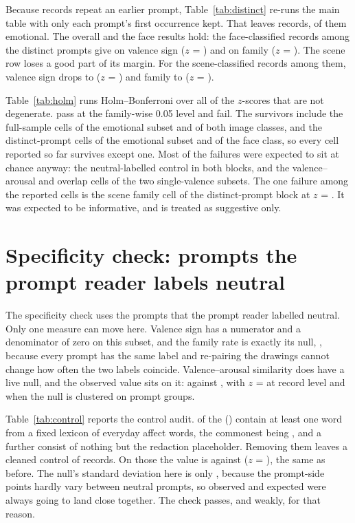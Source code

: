 Because \nRepeats{} records repeat an earlier prompt, Table~\ref{tab:distinct} re-runs the main table with only each prompt's first occurrence kept. That leaves \nDistinct{} records, \nDistinctEmo{} of them emotional. The overall and the face results hold: the \DistFaceN{} face-classified records among the distinct prompts give \DistFaceSignObs{} on valence sign ($z$ = \DistFaceSignZ{}) and \DistFaceFamObs{} on family ($z$ = \DistFaceFamZ{}). The scene row loses a good part of its margin. For the \DistSceneN{} scene-classified records among them, valence sign drops to \DistSceneSignObs{} ($z$ = \DistSceneSignZ{}) and family to \DistSceneFamObs{} ($z$ = \DistSceneFamZ{}).

Table~\ref{tab:holm} runs Holm--Bonferroni over all \HolmM{} of the $z$-scores that are not degenerate. \HolmSurvive{} pass at the family-wise 0.05 level and \HolmFail{} fail. The survivors include the full-sample cells of the emotional subset and of both image classes, and the distinct-prompt cells of the emotional subset and of the face class, so every cell reported so far survives except one. Most of the failures were expected to sit at chance anyway: the neutral-labelled control in both blocks, and the valence--arousal and overlap cells of the two single-valence subsets. The one failure among the reported cells is the scene family cell of the distinct-prompt block at $z$ = \DistSceneFamZ{}. It was expected to be informative, and is treated as suggestive only.




\section{Specificity check: prompts the prompt reader labels neutral}
\label{sec:results-control}

The specificity check uses the \CtrlN{} prompts that the prompt reader labelled neutral. Only one measure can move here. Valence sign has a numerator and a denominator of zero on this subset, and the family rate is exactly its null, \CtrlFamObs{}, because every prompt has the same label and re-pairing the drawings cannot change how often the two labels coincide. Valence--arousal similarity does have a live null, and the observed value sits on it: \CtrlVaObs{} against \CtrlVaNull{}, with $z$ = \CtrlVaZ{} at record level and \CtrlVaZClustered{} when the null is clustered on prompt groups.

Table~\ref{tab:control} reports the control audit. \CtrlFlagged{} of the \CtrlN{} (\CtrlFlaggedPct{}) contain at least one word from a fixed lexicon of \CtrlLexicon{} everyday affect words, the commonest being \CtrlTopWords{}, and a further \CtrlNameOnly{} consist of nothing but the redaction placeholder. Removing them leaves a cleaned control of \CtrlCleanN{} records. On those the value is \CtrlCleanVaObs{} against \CtrlCleanVaNull{} ($z$ = \CtrlCleanVaZ{}), the same as before. The null's standard deviation here is only \CtrlVaSd{}, because the prompt-side points hardly vary between neutral prompts, so observed and expected were always going to land close together. The check passes, and weakly, for that reason.

